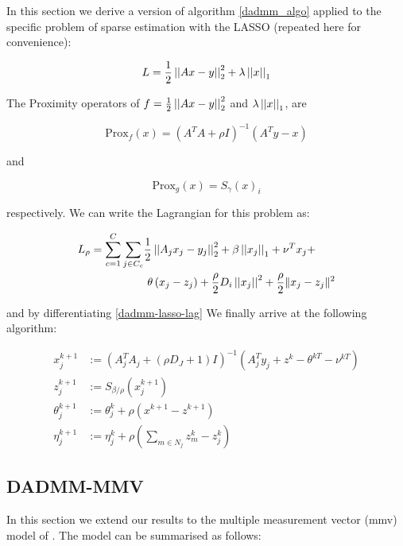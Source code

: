 In this section we derive a version of algorithm \ref{dadmm_algo} applied to the specific problem of sparse estimation with the LASSO (repeated here for convenience):

\begin{equation}
L = \frac{1}{2} \left|\left|Ax-y\right|\right|_2^2 + \lambda\left|\left|x\right|\right|_1
\label{LASSO-chapter5}
\end{equation}

The Proximity operators of \(f = \frac{1}{2} \left|\left|Ax-y\right|\right|_2^2\) and \(\lambda\left|\left|x\right|\right|_1\), are 

\begin{equation}
\mathrm{Prox}_f\left(x\right) = \left(A^TA + \rho I\right)^{-1}\left(A^Ty - x\right)
\end{equation}

and 

\begin{equation}
\mathrm{Prox}_g\left(x\right) = S_\gamma\left(x\right)_i 
\end{equation}

respectively. We can write the Lagrangian for this problem as:

\begin{align}
L_\rho = \sum_{c=1}^C\sum_{j \in C_c} & \frac{1}{2} \left|\left|A_j x_j -y_j\right|\right|_2^2  + \beta\left|\left|x_j\right|\right|_1  + \nu^Tx_j  + \\
& \text{        } \theta\left(x_j - z_j\right) + \frac{\rho}{2}D_i\left|\left|x_j\right|\right|^2 + \frac{\rho}{2}\|x_j-z_j\|^2
\label{dadmm-lasso-lag}
\end{align}

and by differentiating \eqref{dadmm-lasso-lag} We finally arrive at the following algorithm:

\begin{corollary}
\begin{align}
x_j^{k+1} &:= \left(A_j^TA_j + (\rho D_J + 1) I\right)^{-1}\left(A_j^Ty_j +  z^k - \theta^{kT} - \nu^{kT}\right)\\
z_j^{k+1} &:= S_{\beta/\rho}\left(x_j^{k+1} \right)
 \\
\theta_j^{k+1} &:= \theta_j^{k} + \rho \left(x^{k+1}-z^{k+1}\right) \\
\eta_j^{k+1} &:= \eta_j^k + \rho\left(\sum_{m \in N_j} z_m^k - z_j^k\right)
\label{dadmm_algo_lasso}
\end{align}
\end{corollary}

\subsection{DADMM-MMV}\label{sec:mmv-algo}
In this section we extend our results to the multiple measurement vector (\gls{mmv}) model of \cite{cotter2005sparse}. The model can be summarised as follows:

